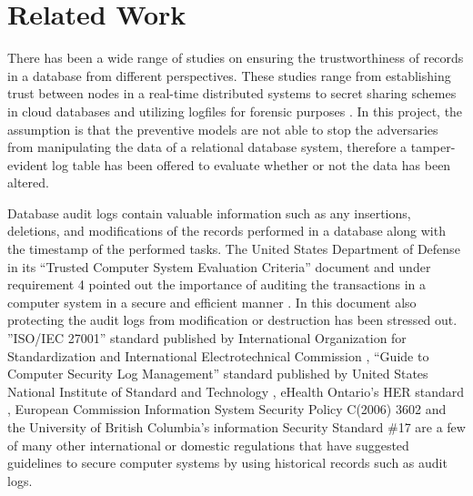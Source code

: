 	\section {Related Work} \label{sec:related_work}
		There has been a wide range of studies on ensuring the trustworthiness of records in a database from different perspectives. These studies range from establishing trust between nodes in a real-time distributed systems \cite{khayat2017trust} to secret sharing schemes in cloud databases \cite{dutta2013privacy} and utilizing logfiles for forensic purposes \cite{sinha2014continuous}. In this project, the assumption is that the preventive models are not able to stop the adversaries from manipulating the data of a relational database system, therefore a tamper-evident log table has been offered to evaluate whether or not the data has been altered. 

		Database audit logs contain valuable information such as any insertions, deletions, and modifications of the records performed in a database along with the timestamp of the performed tasks. The United States Department of Defense in its “Trusted Computer System Evaluation Criteria” document and under requirement 4 pointed out the importance of auditing the transactions in a computer system in a secure and efficient manner \cite{USDoD1985}. In this document also protecting the audit logs from modification or destruction has been stressed out. ”ISO/IEC 27001” standard published by International Organization for Standardization and International Electrotechnical Commission \cite{ISOIEC27001}, “Guide to Computer Security Log Management” standard published by United States National Institute of Standard and Technology \cite{NIST2006}, eHealth Ontario's HER standard \cite{ehealth3542}, European Commission Information System Security Policy C(2006) 3602 \cite{EC2006} and the University of British Columbia's information Security Standard {\#}17 \cite{UBC2014} are a few of many other international or domestic regulations that have suggested guidelines to secure computer systems by using historical records such as audit logs.

